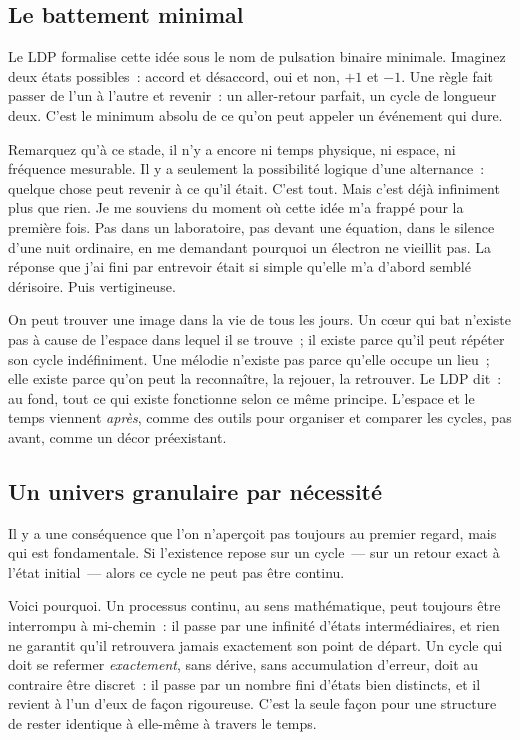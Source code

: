 \documentclass[12pt, a4paper, openright]{book}
\begin{document}
\subsection*{Le battement minimal}

Le LDP formalise cette idée sous le nom de pulsation binaire minimale. Imaginez deux états possibles~: accord et désaccord, oui et non, $+1$ et $-1$. Une règle fait passer de l'un à l'autre et revenir~: un aller-retour parfait, un cycle de longueur deux. C'est le minimum absolu de ce qu'on peut appeler un événement qui dure.

\medskip

Remarquez qu'à ce stade, il n'y a encore ni temps physique, ni espace, ni fréquence mesurable. Il y a seulement la possibilité logique d'une alternance~: quelque chose peut revenir à ce qu'il était. C'est tout. Mais c'est déjà infiniment plus que rien. Je me souviens du moment où cette idée m'a frappé pour la première fois. Pas dans un laboratoire, pas devant une équation, dans le silence d'une nuit ordinaire, en me demandant pourquoi un électron ne vieillit pas. La réponse que j'ai fini par entrevoir était si simple qu'elle m'a d'abord semblé dérisoire. Puis vertigineuse.

\medskip

On peut trouver une image dans la vie de tous les jours. Un c\oe{}ur qui bat n'existe pas à cause de l'espace dans lequel il se trouve~; il existe parce qu'il peut répéter son cycle indéfiniment. Une mélodie n'existe pas parce qu'elle occupe un lieu~; elle existe parce qu'on peut la reconnaître, la rejouer, la retrouver. Le LDP dit~: au fond, tout ce qui existe fonctionne selon ce même principe. L'espace et le temps viennent \emph{après}, comme des outils pour organiser et comparer les cycles, pas avant, comme un décor préexistant.

\subsection*{Un univers granulaire par nécessité}

Il y a une conséquence que l'on n'aperçoit pas toujours au premier regard, mais qui est fondamentale. Si l'existence repose sur un cycle~--- sur un retour exact à l'état initial~--- alors ce cycle ne peut pas être continu.

\medskip

Voici pourquoi. Un processus continu, au sens mathématique, peut toujours être interrompu à mi-chemin~: il passe par une infinité d'états intermédiaires, et rien ne garantit qu'il retrouvera jamais exactement son point de départ. Un cycle qui doit se refermer \emph{exactement}, sans dérive, sans accumulation d'erreur, doit au contraire être discret~: il passe par un nombre fini d'états bien distincts, et il revient à l'un d'eux de façon rigoureuse. C'est la seule façon pour une structure de rester identique à elle-même à travers le temps.
\end{document}
